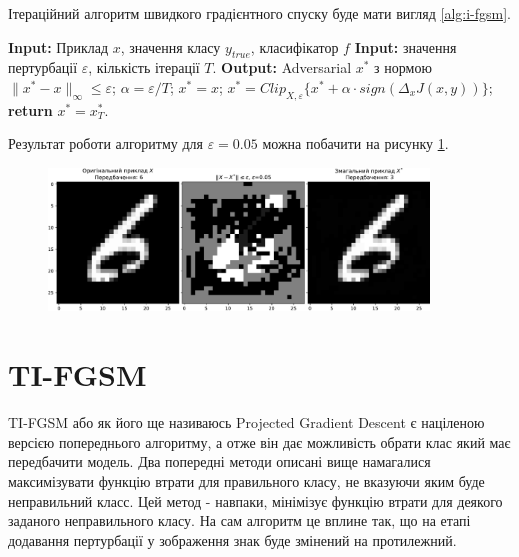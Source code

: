 \documentclass[a4paper,14pt]{extreport}
\renewcommand{\algorithmicrequire}{\textbf{Input: }}
\renewcommand{\algorithmicensure}{\textbf{Output: }}
\newcommand{\algorithmreturn}{\textbf{return }}
\begin{document}
	Ітераційний алгоритм швидкого градієнтного спуску буде мати вигляд \ref{alg:i-fgsm}.
	\begin{algorithm}
		\caption{$I-FGSM$}
		\label{alg:i-fgsm}
		\begin{algorithmic}[1]
			\State \algorithmicrequire{Приклад $x$, значення класу $y_{true}$, класифікатор $f$}
			\State \algorithmicrequire{значення пертурбації $\varepsilon$, кількість ітерації $T$.}
			\State \algorithmicensure{ Adversarial $x^{*}$ з нормою $\|x^{*} - x\|_{\infty} \leq \varepsilon $;}
			\State $\alpha = \varepsilon / T $;
			\State $x^{*} = x$;
			\State $x^{*} = Clip_{X, \varepsilon} \big\{ x^{*} + \alpha \cdot  sign(\Delta_x J(x, y)) \big\}$;
			\EndFor
			\State \algorithmreturn{$x^{*} = x^{*}_{T}$}.
		\end{algorithmic}
	\end{algorithm}
	
	Результат роботи алгоритму для $\varepsilon = 0.05$ можна побачити на рисунку \ref{fig:i-fgsm-example}.
	\begin{figure}[h]
		\centering
		\includegraphics[width=0.9\textwidth]{resources/i-fgsm-example.pdf}
		\caption{}
		\label{fig:i-fgsm-example}
	\end{figure}
		
	\newpage
	\section{TI-FGSM}
	TI-FGSM або як його ще називаюсь Projected Gradient Descent є націленою версією попереднього алгоритму, а отже він дає можливість обрати клас який має передбачити модель. Два попередні методи описані вище намагалися максимізувати функцію втрати для правильного класу, не вказуючи яким буде неправильний класс. Цей метод - навпаки, мінімізує функцію втрати для деякого заданого неправильного класу. На сам алгоритм це вплине так, що на етапі додавання пертурбації у зображення знак буде змінений на протилежний. 
\end{document}
